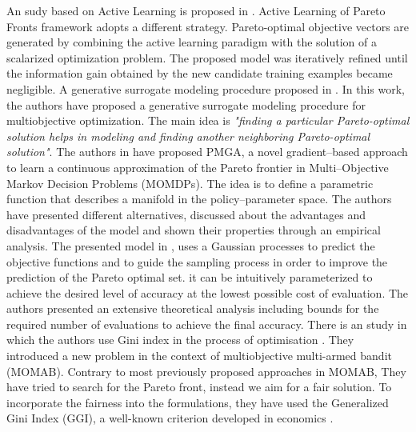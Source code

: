 An sudy based on Active Learning is proposed in \cite{campigotto2014active}. Active Learning of Pareto Fronts framework adopts a different strategy. Pareto-optimal objective vectors are generated by combining the active learning paradigm with the solution of a scalarized optimization problem. The proposed model was iteratively refined until the information gain obtained by the new candidate training examples became negligible.
A generative surrogate modeling procedure proposed in \cite{hussein2016generative}. In this work, the authors have proposed a generative surrogate modeling procedure for multiobjective optimization. The main idea is \textit{"finding a particular Pareto-optimal solution helps in modeling and finding another neighboring Pareto-optimal solution"}. 
The authors in \cite{pirotta2015multi} have proposed PMGA, a novel gradient–based approach to learn a continuous approximation of the Pareto frontier in 
Multi–Objective Markov Decision Problems (MOMDPs). The idea is to define a parametric function that describes a manifold in the policy–parameter space.
The authors have presented different alternatives, discussed about the advantages and disadvantages of the model and shown their properties through an empirical analysis.
The presented model in \cite{zuluaga2013active}, uses a Gaussian processes to predict the objective functions and to guide the sampling process in
order to improve the prediction of the Pareto optimal set. it can be intuitively parameterized to achieve the desired level of accuracy at the lowest possible cost of evaluation. The authors presented an extensive theoretical analysis including bounds for the required number of evaluations to achieve the final accuracy. 
There is an study in which the authors use Gini index in the process of optimisation \cite{busa2017multi}. They introduced a new problem in the context of multiobjective multi-armed bandit (MOMAB). Contrary to most previously proposed approaches in MOMAB, They have tried to search for the Pareto front, instead we aim for a fair solution. To incorporate the fairness into the formulations, they have used the Generalized Gini Index (GGI), a well-known criterion developed in economics \cite{busa2017multi}.

